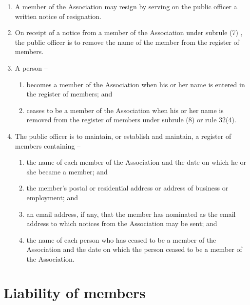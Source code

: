 \documentclass[a4paper,11pt]{article}
\begin{document}
\begin{enumerate}
	\item A member of the Association may resign by serving on the public officer a written notice of resignation.
	\item On receipt of a notice from a member of the Association under subrule (7) , the public officer is to remove the name of the member from the register of members.

	\item A person --
	\begin{enumerate}
		\item becomes a member of the Association when his or her name is entered in the register of members; and
		\item ceases to be a member of the Association when his or her name is removed from the register of members under subrule (8) or rule 32(4).
	\end{enumerate}
	
	\item The public officer is to maintain, or establish and maintain, a register of members containing --
	\begin{enumerate}
		\item the name of each member of the Association and the date on which he or she became a member; and
		\item the member's postal or residential address or address of business or employment; and
		\item an email address, if any, that the member has nominated as the email address to which notices from the Association may be sent; and
		\item the name of each person who has ceased to be a member of the Association and the date on which the person ceased to be a member of the Association.
	\end{enumerate}
	
\end{enumerate}

\section{Liability of members}
\end{document}
